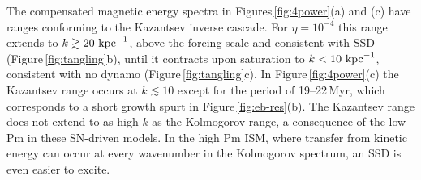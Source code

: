 \documentclass[preprint2]{aastex63}
\newcommand\kpc{~ {\rm kpc}}
\begin{document}
 The compensated magnetic energy spectra in
 Figures\,\ref{fig:4power}(a) and (c)
 have ranges conforming to the Kazantsev inverse cascade.
 For $\eta=10^{-4}$ this range extends to $k\gtrsim 20\kpc^{-1}$, above the forcing
 scale and consistent with SSD (Figure\,\ref{fig:tangling}b), 
 until it contracts upon saturation to $k<10\kpc^{-1}$, consistent with no dynamo 
 (Figure\,\ref{fig:tangling}c).
 In Figure\,\ref{fig:4power}(c) the Kazantsev range occurs at $k\lesssim10$
 except for the period of 19--22\,Myr, which corresponds to a short growth spurt in
 Figure\,\ref{fig:eb-res}(b).
 The Kazantsev range does not extend to as high $k$ as the Kolmogorov range,
 a consequence of 
 the low Pm in these SN-driven models. 
 In the high Pm ISM, where transfer from kinetic energy can occur at every
 wavenumber in the Kolmogorov spectrum, an SSD is even easier to excite.
\end{document}
